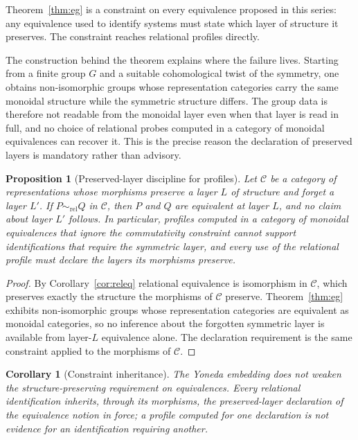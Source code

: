 \documentclass[11pt,letterpaper]{article}
\newtheorem{proposition}[theorem]{Proposition}
\newtheorem{corollary}[theorem]{Corollary}
\theoremstyle{definition}
\theoremstyle{remark}
\begin{document}
Theorem~\ref{thm:eg} is a constraint on every equivalence proposed in this series: any equivalence used to identify systems must state which layer of structure it preserves. The constraint reaches relational profiles directly.

The construction behind the theorem explains where the failure lives. Starting from a finite group $G$ and a suitable cohomological twist of the symmetry, one obtains non-isomorphic groups whose representation categories carry the same monoidal structure while the symmetric structure differs. The group data is therefore not readable from the monoidal layer even when that layer is read in full, and no choice of relational probes computed in a category of monoidal equivalences can recover it. This is the precise reason the declaration of preserved layers is mandatory rather than advisory.

\begin{proposition}[Preserved-layer discipline for profiles]
\label{prop:discipline}
Let $\mathcal{C}$ be a category of representations whose morphisms preserve a layer $L$ of structure and forget a layer $L'$. If $P \sim_{\mathrm{rel}} Q$ in $\mathcal{C}$, then $P$ and $Q$ are equivalent at layer $L$, and no claim about layer $L'$ follows. In particular, profiles computed in a category of monoidal equivalences that ignore the commutativity constraint cannot support identifications that require the symmetric layer, and every use of the relational profile must declare the layers its morphisms preserve.
\end{proposition}

\begin{proof}
By Corollary~\ref{cor:releq} relational equivalence is isomorphism in $\mathcal{C}$, which preserves exactly the structure the morphisms of $\mathcal{C}$ preserve. Theorem~\ref{thm:eg} exhibits non-isomorphic groups whose representation categories are equivalent as monoidal categories, so no inference about the forgotten symmetric layer is available from layer-$L$ equivalence alone. The declaration requirement is the same constraint applied to the morphisms of $\mathcal{C}$.
\end{proof}

\begin{corollary}[Constraint inheritance]
\label{cor:inherit}
The Yoneda embedding does not weaken the structure-preserving requirement on equivalences. Every relational identification inherits, through its morphisms, the preserved-layer declaration of the equivalence notion in force; a profile computed for one declaration is not evidence for an identification requiring another.
\end{corollary}
\end{document}
